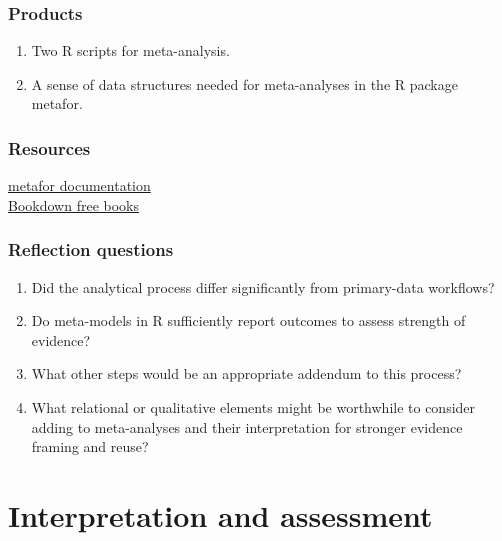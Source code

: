 \documentclass[
]{book}
\providecommand{\tightlist}{%
  \setlength{\itemsep}{0pt}\setlength{\parskip}{0pt}}
\begin{document}
\hypertarget{products-2}{%
\subsection*{Products}\label{products-2}}

\begin{enumerate}
\def\labelenumi{\arabic{enumi}.}
\tightlist
\item
  Two R scripts for meta-analysis.\\
\item
  A sense of data structures needed for meta-analyses in the R package metafor.
\end{enumerate}

\hypertarget{resources-2}{%
\subsection*{Resources}\label{resources-2}}

\href{https://www.metafor-project.org/doku.php}{metafor documentation}\\
\href{https://bookdown.org/home/tags/meta-analysis/}{Bookdown free books}

\hypertarget{reflection-questions-2}{%
\subsection*{Reflection questions}\label{reflection-questions-2}}

\begin{enumerate}
\def\labelenumi{\arabic{enumi}.}
\tightlist
\item
  Did the analytical process differ significantly from primary-data workflows?\\
\item
  Do meta-models in R sufficiently report outcomes to assess strength of evidence?\\
\item
  What other steps would be an appropriate addendum to this process?\\
\item
  What relational or qualitative elements might be worthwhile to consider adding to meta-analyses and their interpretation for stronger evidence framing and reuse?
\end{enumerate}

\hypertarget{interpretation}{%
\chapter{Interpretation and assessment}\label{interpretation}}
\end{document}
